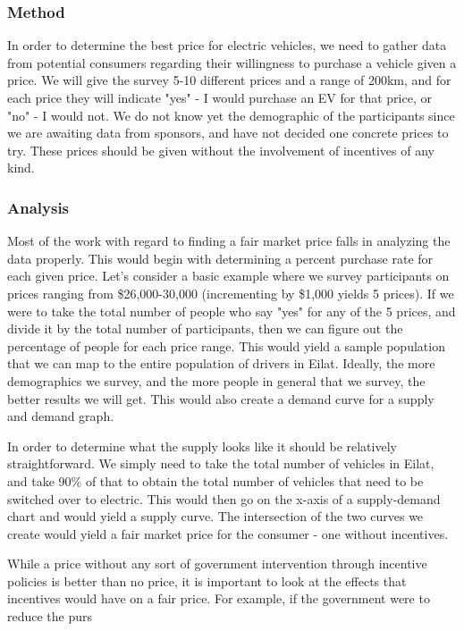 \documentclass{article}                         %
\begin{document}
\subsubsection{Method}
In order to determine the best price for electric vehicles, we need to gather data from potential consumers regarding their willingness to purchase a vehicle given a price. We will give the survey 5-10 different prices and a range of 200km, and for each price they will indicate "yes" - I would purchase an EV for that price, or "no" - I would not. We do not know yet the demographic of the participants since we are awaiting data from sponsors, and have not decided one concrete prices to try. These prices should be given without the involvement of incentives of any kind.

\subsubsection{Analysis}
Most of the work with regard to finding a fair market price falls in analyzing the data properly. This would begin with determining a percent purchase rate for each given price. Let's consider a basic example where we survey participants on prices ranging from \$26,000-30,000 (incrementing by \$1,000 yields 5 prices). If we were to take the total number of people who say "yes" for any of the 5 prices, and divide it by the total number of participants, then we can figure out the percentage of people for each price range. This would yield a sample population that we can map to the entire population of drivers in Eilat. Ideally, the more demographics we survey, and the more people in general that we survey, the better results we will get. This would also create a demand curve for a supply and demand graph.

In order to determine what the supply looks like it should be relatively straightforward. We simply need to take the total number of vehicles in Eilat, and take 90\% of that to obtain the total number of vehicles that need to be switched over to electric. This would then go on the x-axis of a supply-demand chart and would yield a supply curve. The intersection of the two curves we create would yield a fair market price for the consumer - one without incentives.

While a price without any sort of government intervention through incentive policies is better than no price, it is important to look at the effects that incentives would have on a fair price. For example, if the government were to reduce the purs
\end{document}
